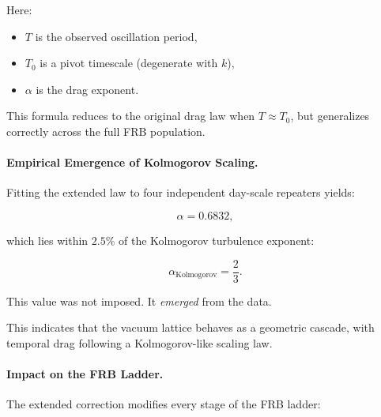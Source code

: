 \documentclass[11pt, letterpaper, openany]{book}
\begin{document}
Here:
\begin{itemize}
    \item $T$ is the observed oscillation period,
    \item $T_0$ is a pivot timescale (degenerate with $k$),
    \item $\alpha$ is the drag exponent.
\end{itemize}

This formula reduces to the original drag law when $T \approx T_0$, but generalizes correctly 
across the full FRB population.

\paragraph{Empirical Emergence of Kolmogorov Scaling.}

Fitting the extended law to four independent day-scale repeaters yields:



\[
\alpha = 0.6832,
\]



which lies within $2.5\%$ of the Kolmogorov turbulence exponent:



\[
\alpha_{\text{Kolmogorov}} = \frac{2}{3}.
\]



This value was not imposed.  
It \textit{emerged} from the data.

This indicates that the vacuum lattice behaves as a geometric cascade, with temporal drag following 
a Kolmogorov-like scaling law.

\paragraph{Impact on the FRB Ladder.}

The extended correction modifies every stage of the FRB ladder:
\end{document}
